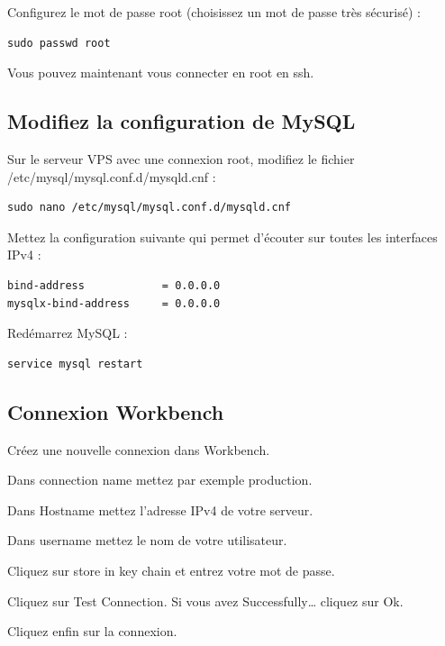 \documentclass{article}
\begin{document}
Configurez le mot de passe root (choisissez un mot de passe très sécurisé) :
\begin{verbatim}
sudo passwd root
\end{verbatim}

Vous pouvez maintenant vous connecter en root en ssh.

\subsection{Modifiez la configuration de MySQL}
Sur le serveur VPS avec une connexion root, modifiez le fichier /etc/mysql/mysql.conf.d/mysqld.cnf :
\begin{verbatim}
sudo nano /etc/mysql/mysql.conf.d/mysqld.cnf
\end{verbatim}

Mettez la configuration suivante qui permet d'écouter sur toutes les interfaces IPv4 :
\begin{verbatim}
bind-address            = 0.0.0.0
mysqlx-bind-address     = 0.0.0.0
\end{verbatim}

Redémarrez MySQL :
\begin{verbatim}
service mysql restart
\end{verbatim}

\subsection{Connexion Workbench}
Créez une nouvelle connexion dans Workbench.

Dans connection name mettez par exemple production.

Dans Hostname mettez l'adresse IPv4 de votre serveur.

Dans username mettez le nom de votre utilisateur.

Cliquez sur store in key chain et entrez votre mot de passe.

Cliquez sur Test Connection. Si vous avez Successfully… cliquez sur Ok.

Cliquez enfin sur la connexion.
\end{document}
